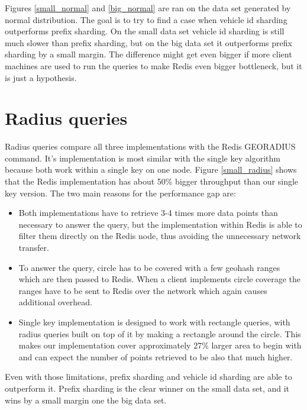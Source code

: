 \documentclass[times, utf8, diplomski]{fer}
\begin{document}
Figures \ref{small_normal} and \ref{big_normal} are ran on the data set generated by normal distribution. The goal is to try to find a case when vehicle id sharding outperforms prefix sharding. On the small data set vehicle id sharding is still much slower than prefix sharding, but on the big data set it outperforms prefix sharding by a small margin. The difference might get even bigger if more client machines are used to run the queries to make Redis even bigger bottleneck, but it is just a hypothesis.

\section {Radius queries} \label{radius_results}
Radius queries compare all three implementations with the Redis GEORADIUS command. It's implementation is most similar with the single key algorithm because both work within a single key on one node. Figure \ref{small_radius} shows that the Redis implementation has about 50\% bigger throughput than our single key version. The two main reasons for the performance gap are:
\begin{itemize}
\item Both implementations have to retrieve 3-4 times more data points than necessary to answer the query, but the implementation within Redis is able to filter them directly on the Redis node, thus avoiding the unnecessary network transfer.
\item To answer the query, circle has to be covered with a few geohash ranges which are then passed to Redis. When a client implements circle coverage the ranges have to be sent to Redis over the network which again causes additional overhead.
\item Single key implementation is designed to work with rectangle queries, with radius queries built on top of it by making a rectangle around the circle. This makes our implementation cover approximately 27\% larger area to begin with and can expect the number of points retrieved to be also that much higher.
\end{itemize}
Even with those limitations, prefix sharding and vehicle id sharding are able to outperform it. Prefix sharding is the clear winner on the small data set, and it wins by a small margin one the big data set.
\end{document}
